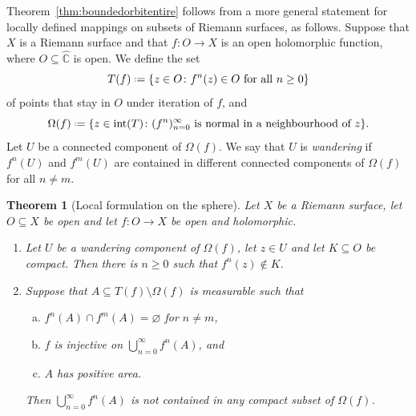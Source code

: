 \documentclass[12pt,a4paper,reqno]{amsart}
\theoremstyle{plain}
\newtheorem{thm}{Theorem}[section]
\renewcommand{\subset}{\subseteq}
\theoremstyle{definition}
\theoremstyle{remark}
\newcommand{\interior}{\operatorname{int}}
\numberwithin{equation}{section}
\newcommand \Ch{\widehat{\mathbb{C}}}
\newcommand*{\defeq}{\mathrel{\vcenter{\baselineskip0.5ex \lineskiplimit0pt
                     \hbox{\scriptsize.}\hbox{\scriptsize.}}}%
                     =}
\newcommand{\lr}[1]{{\color{magenta} #1}}
\begin{document}
\lr{Theorem~\ref{thm:boundedorbitentire} follows from a more general statement for locally
defined mappings on subsets of Riemann surfaces, as follows. 
Suppose that $X$ is a Riemann surface and that 
 $f\colon O\to X$ is an open holomorphic function, where $O\subset\Ch$ is open.
We define the set 
\begin{equation}\label{eqn:TV}
 T(f)\defeq \{z\in O\colon f^n(z)\in O\text{ for all }n\ge0\}
\end{equation}
 of points that stay in $O$ under iteration of $f$, and  
  \begin{equation}\label{eqn:OmegaV}
  \Omega(f) \defeq \{z\in \interior(T)\colon (f^n)_{n=0}^{\infty} \text{ is normal
      in a neighbourhood of $z$} \}.\end{equation} 
Let $U$ be a connected component of $\Omega(f)$. We say that 
  $U$ is \emph{wandering} if $f^n(U)$ and $f^m(U)$ are contained in different 
  connected components of $\Omega(f)$ for all $n\neq m$. 
\begin{thm}[Local formulation on the sphere]\label{thm:spherelocal}
Let $X$ be a Riemann surface, let $O\subset X$ be open and let
  $f\colon O\to X$ be open and holomorphic.
\begin{enumerate}[(1)]
\item\label{it: no wandering orbit} Let $U$ be a wandering component of $\Omega(f)$, let $z\in U$
 and let $K\subset O$ be compact.  Then there is $n\geq 0$ such that $f^n(z)\notin K$.
\item\label{it: no wandering set} Suppose that $A\subset T(f)\setminus\Omega(f)$ is measurable such that
 \begin{enumerate}[(a)]
  \item $f^n(A)\cap f^m(A) =\varnothing$ for $n\neq m$,
   \item $f$ is injective on $\bigcup_{n=0}^{\infty} f^n(A)$, and
   \item $A$ has positive area. 
  \end{enumerate}
  Then $\bigcup_{n=0}^{\infty} f^n(A)$ is not contained in any compact subset of $\Omega(f)$.
\end{enumerate}
\end{thm}

}
\end{document}
